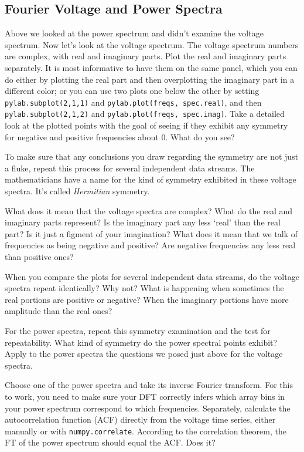 \documentclass[12pt,preprint]{aastex}
\begin{document}
\subsection{Fourier Voltage and Power Spectra}

Above we looked
at the power spectrum and didn't examine the voltage spectrum. Now let's
look at the voltage spectrum. The voltage spectrum numbers are complex,
with real and imaginary parts. Plot the real and imaginary parts
separately. It is most informative to have them on the same panel, which
you can do either by plotting the real part and then overplotting the
imaginary part in a different color; or you can use two plots one below
the other by setting {\tt pylab.subplot(2,1,1)} and {\tt pylab.plot(freqs, spec.real)},
  and then {\tt pylab.subplot(2,1,2)} and {\tt pylab.plot(freqs, spec.imag)}.
 Take a detailed look at the plotted points with the
goal of seeing if they exhibit any symmetry for negative and positive
frequencies about 0. What do you see?

To make sure that any conclusions you draw regarding the symmetry are
not just a fluke, repeat this process for several independent data
streams.  The mathematicians have a name for the kind of symmetry
exhibited in these voltage spectra. It's called {\it Hermitian} symmetry.

What does it mean that the voltage spectra are complex? What do the real
and imaginary parts represent? Is the imaginary part any less `real'
than the real part? Is it just a figment of your imagination?
What does it mean that we talk of frequencies as being negative and
positive? Are negative frequencies any less real than positive ones?

When you compare the plots for several independent data streams, do the
voltage spectra repeat identically?  Why not? What is happening when
sometimes the real portions are positive or negative? When the imaginary
portions have more amplitude than the real ones?

For the power spectra, repeat this symmetry examination and the test for
repeatability. What kind of symmetry do the power spectral points
exhibit? Apply to the power spectra the questions we posed just above
for the voltage spectra.

Choose one of the power spectra and take its inverse Fourier transform.
For this to work, you need to make sure your DFT correctly infers
which array bins in your power spectrum correspond to which frequencies.
Separately, calculate the autocorrelation function (ACF) directly from 
the voltage time series, either manually or with \verb$numpy.correlate$.
According to the correlation theorem, the FT
of the power spectrum should equal the ACF. Does it? 
\end{document}
